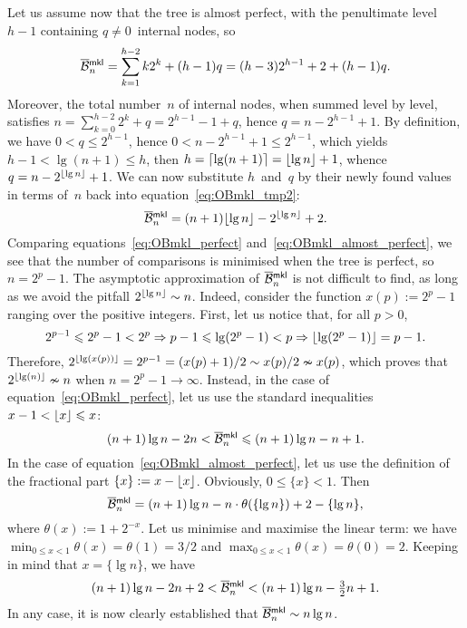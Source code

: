 Let us assume now that the tree is almost perfect, with the
penultimate level \(h-1\) containing \(q \neq 0\)~internal nodes, so
\begin{equation}
\OB{\fun{mkl}}{n} = \sum_{k=1}^{h-2}k2^k + (h-1)q
= (h-3)2^{h-1} + 2 + (h-1)q.
\label{eq:OBmkl_tmp2}
\end{equation}
Moreover, the total number~\(n\) of internal nodes, when summed level
by level, satisfies \(n = \sum_{k=0}^{h-2}2^k + q = 2^{h-1} - 1 + q\),
hence \(q = n - 2^{h-1} + 1\). By definition, we have \(0 < q
\leqslant 2^{h-1}\), hence \(0 < n - 2^{h-1} + 1 \leqslant 2^{h-1}\),
which yields \(h - 1 < \lg(n+1) \leqslant h\), then \(h =
\lceil{\lg(n+1)}\rceil = \lfloor{\lg n}\rfloor + 1\), whence \(q = n -
2^{\lfloor{\lg n}\rfloor} + 1\). We can now substitute \(h\)~and~\(q\) by
their newly found values in terms of~\(n\) back into
equation~\eqref{eq:OBmkl_tmp2}:
\begin{equation}
\OB{\fun{mkl}}{n} = (n+1)\floor{\lg n} - 2^{\floor{\lg n}} + 2.
\label{eq:OBmkl_almost_perfect}
\end{equation}
Comparing equations~\eqref{eq:OBmkl_perfect}
and~\eqref{eq:OBmkl_almost_perfect}, we see that the number of
comparisons is minimised when the tree is perfect, so \(n = 2^p -
1\). The asymptotic approximation of \(\OB{\fun{mkl}}{n}\) is not
difficult to find, as long as we avoid the pitfall \(2^{\lfloor{\lg n}\rfloor}
\sim n\). Indeed, consider the function \(x(p) := 2^p - 1\) ranging
over the positive integers. First, let us notice that, for all
\(p>0\),
\begin{equation*}
2^{p-1} \leqslant 2^p - 1 < 2^p \Rightarrow p-1 \leqslant \lg(2^p-1) <
p \Rightarrow \lfloor{\lg(2^p-1)}\rfloor = p-1.
\end{equation*}
Therefore, \(2^{\lfloor{\lg(x(p))}\rfloor} = 2^{p-1} = (x(p)+1)/2 \sim x(p)/2
\nsim x(p)\), which proves that \(2^{\lfloor{\lg(n)}\rfloor} \nsim n\) when
\(n=2^p-1 \rightarrow \infty\). Instead, in the case of
equation~\eqref{eq:OBmkl_perfect}, let us use the standard
inequalities \(x - 1 < \lfloor{x}\rfloor \leqslant x\):
\begin{equation*}
(n+1)\lg n - 2n < \OB{\fun{mkl}}{n} \leqslant (n+1)\lg n - n + 1.
\end{equation*}
In the case of equation~\eqref{eq:OBmkl_almost_perfect}, let us use
the definition of the fractional part \(\{x\}
:= x - \lfloor{x}\rfloor\). Obviously, \(0 \leqslant \{x\} < 1\). Then
\begin{equation*}
\OB{\fun{mkl}}{n} = (n+1)\lg n - n \cdot \theta(\{\lg n\})
                    + 2 - \{\lg n\},
\end{equation*}
where \(\theta(x) := 1 + 2^{-x}\). Let us minimise and maximise the
linear term: we have \(\min_{0 \leqslant x <
  1}\theta(x) = \theta(1) = 3/2\) and \(\max_{0 \leqslant x <
  1}\theta(x) = \theta(0) = 2\). Keeping in mind that \(x=\{\lg n\}\),
we have
\begin{equation*}
(n+1)\lg n - 2n + 2 < \OB{\fun{mkl}}{n} < (n+1)\lg n - \tfrac{3}{2}n + 1.
\end{equation*}
In any case, it is now clearly established that \(\OB{\fun{mkl}}{n}
\sim n\lg n\).

